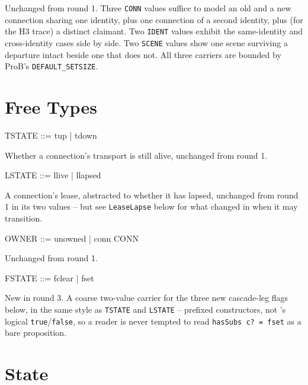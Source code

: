 \documentclass[a4paper,10pt,fleqn]{article}
\begin{document}
\begin{zed}
\end{zed}

Unchanged from round 1. Three \texttt{CONN} values suffice to model an old
and a new connection sharing one identity, plus one connection of a
second identity, plus (for the H3 trace) a distinct claimant. Two
\texttt{IDENT} values exhibit the same-identity and cross-identity cases
side by side. Two \texttt{SCENE} values show one scene surviving a
departure intact beside one that does not. All three carriers are bounded
by ProB's \texttt{DEFAULT\_SETSIZE}.

\section{Free Types}

\begin{zed}
  TSTATE ::= tup | tdown
\end{zed}

Whether a connection's transport is still alive, unchanged from round 1.

\begin{zed}
  LSTATE ::= llive | llapsed
\end{zed}

A connection's lease, abstracted to whether it has lapsed, unchanged from
round 1 in its two values -- but see \texttt{LeaseLapse} below for what
changed in when it may transition.

\begin{zed}
  OWNER ::= unowned | conn \ldata CONN \rdata
\end{zed}

Unchanged from round 1.

\begin{zed}
  FSTATE ::= fclear | fset
\end{zed}

New in round 3. A coarse two-value carrier for the three new cascade-leg
flags below, in the same style as \texttt{TSTATE} and \texttt{LSTATE} --
prefixed constructors, not \fuzz's logical \texttt{true}/\texttt{false}, so a
reader is never tempted to read \texttt{hasSubs~c? = fset} as a bare
proposition.

\section{State}
\end{document}
